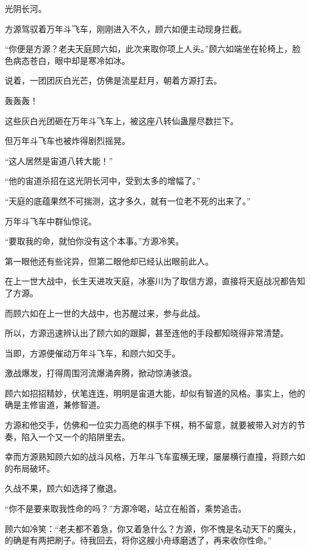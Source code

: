 
\begin{this_body}



光阴长河。

方源驾驭着万年斗飞车，刚刚进入不久，顾六如便主动现身拦截。

“你便是方源？老夫天庭顾六如，此次来取你项上人头。”顾六如端坐在轮椅上，脸色病态苍白，眼中却是寒冷如冰。

说着，一团团灰白光芒，仿佛是流星赶月，朝着方源打去。

轰轰轰！

这些灰白光团砸在万年斗飞车上，被这座八转仙蛊屋尽数拦下。

但万年斗飞车也被炸得剧烈摇晃。

“这人居然是宙道八转大能！”

“他的宙道杀招在这光阴长河中，受到太多的增幅了。”

“天庭的底蕴果然不可揣测，这才多久，就有一位老不死的出来了。”

万年斗飞车中群仙惊诧。

“要取我的命，就怕你没有这个本事。”方源冷笑。

第一眼他还有些诧异，但第二眼他却已经认出眼前此人。

在上一世大战中，长生天进攻天庭，冰塞川为了取信方源，直接将天庭战况都告知了方源。

而顾六如在上一世的大战中，也苏醒过来，参与此战。

所以，方源迅速辨认出了顾六如的跟脚，甚至连他的手段都知晓得非常清楚。

当即，方源便催动万年斗飞车，和顾六如交手。

激战爆发，打得周围河流爆涌奔腾，掀动惊涛骇浪。

顾六如招招精妙，伏笔连连，明明是宙道大能，却似有智道的风格。事实上，他的确是主修宙道，兼修智道。

方源和他交手，仿佛和一位实力高绝的棋手下棋，稍不留意，就要被带入对方的节奏，陷入一个又一个的陷阱里去。

幸而方源熟知顾六如的战斗风格，万年斗飞车蛮横无理，屡屡横行直撞，将顾六如的布局破坏。

久战不果，顾六如选择了撤退。

“你不是要来取我性命的吗？”方源冷喝，站立在船首，乘势追击。

顾六如冷笑：“老夫都不着急，你又着急什么？方源，你不愧是名动天下的魔头，的确是有两把刷子。待我回去，将你这艘小舟琢磨透了，再来收你性命。”


\end{this_body}
